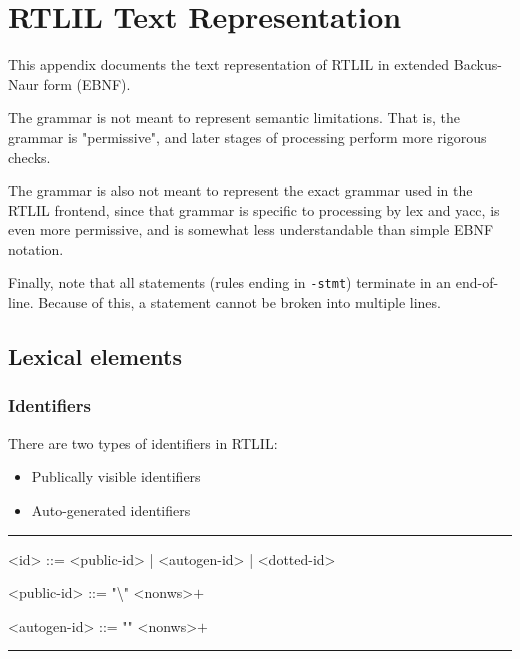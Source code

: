 \chapter{RTLIL Text Representation}
\label{chapter:textrtlil}

\newlength{\myl}

\newenvironment{indentgrammar}[1]
    {\vspace{0.5cm}\hrule
    \setlength{\myl}{\widthof{#1}+2em}
    \grammarindent\the\myl
    \begin{grammar}}
    {\end{grammar}
    \hrule}

This appendix documents the text representation of RTLIL in extended Backus-Naur form (EBNF).

The grammar is not meant to represent semantic limitations. That is, the grammar is "permissive", and later stages of processing perform more rigorous checks.

The grammar is also not meant to represent the exact grammar used in the RTLIL frontend, since that grammar is specific to processing by lex and yacc, is even more permissive, and is somewhat less understandable than simple EBNF notation.

Finally, note that all statements (rules ending in \texttt{-stmt}) terminate in an end-of-line. Because of this, a statement cannot be broken into multiple lines.

\section{Lexical elements}

\subsection{Identifiers}

There are two types of identifiers in RTLIL:

\begin{itemize}
    \item Publically visible identifiers
    \item Auto-generated identifiers
\end{itemize}

\begin{indentgrammar}{<autogen-id>}
<id> ::= <public-id> | <autogen-id> | <dotted-id>

<public-id> ::= "\textbackslash" <nonws>$+$

<autogen-id> ::= "\textdollar" <nonws>$+$
\end{indentgrammar}

